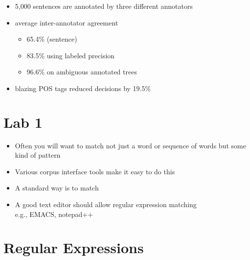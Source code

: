 \documentclass[a4paper,landscape,headrule,footrule,xetex]{foils}
\begin{document}

\begin{itemize}
\item   5,000 sentences are annotated by three different annotators
\item  average inter-annotator agreement
  \begin{itemize}
  \item   65.4\% (sentence)
  \item  83.5\% using labeled precision
  \item 96.6\% on ambiguous annotated trees 
  \end{itemize}
\item blazing  POS tags reduced decisions by 19.5\%
\end{itemize}

\section{Lab 1}


\begin{itemize}
\item Often you will want to match not just a word or sequence of
  words but some kind of pattern
\item Various corpus interface tools make it easy to do this
\item A standard way is to match 
\item A good text editor should allow regular expression matching
\\ e.g., EMACS, notepad++
\end{itemize}

\section{Regular Expressions}
\end{document}
